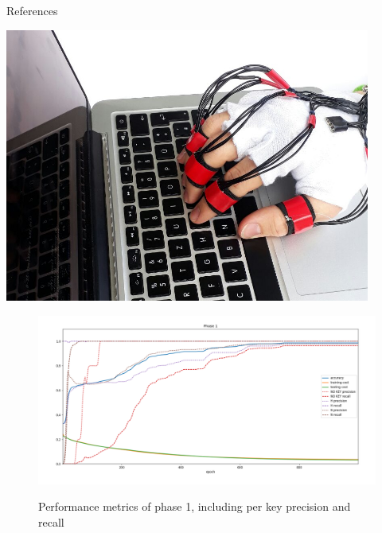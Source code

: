 \appendix
\begin{frame}[allowframebreaks]{References}
    \renewcommand*{\bibfont}{\scriptsize}
    \printbibliography
\end{frame}

\begin{frame}[plain]
   \includegraphics[width=0.9\textwidth]{../common/images/glove-live}
\end{frame}


\begin{frame}[plain]
   \begin{figure}
       \includegraphics[width=\textwidth]{../common/images/phase-1-detailed}
       \label{fig:phase22}
       \caption{Performance metrics of phase 1, including per key precision and recall}
   \end{figure}
\end{frame}

